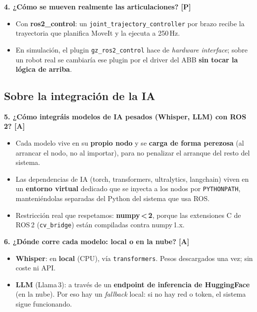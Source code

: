 \documentclass[11pt]{article}
\begin{document}
\textbf{4. ¿Cómo se mueven realmente las articulaciones? [P]}
\begin{itemize}
    \item Con \textbf{ros2\_control}: un \texttt{joint\_trajectory\_controller}
          por brazo recibe la trayectoria que planifica MoveIt y la ejecuta a
          250\,Hz.
    \item En simulación, el plugin \texttt{gz\_ros2\_control} hace de
          \textit{hardware interface}; sobre un robot real se cambiaría ese
          plugin por el driver del ABB \textbf{sin tocar la lógica de arriba}.
\end{itemize}

\subsection*{Sobre la integración de la IA}

\textbf{5. ¿Cómo integráis modelos de IA pesados (Whisper, LLM) con ROS\,2? [A]}
\begin{itemize}
    \item Cada modelo vive en su \textbf{propio nodo} y se \textbf{carga de forma
          perezosa} (al arrancar el nodo, no al importar), para no penalizar el
          arranque del resto del sistema.
    \item Las dependencias de IA (torch, transformers, ultralytics, langchain)
          viven en un \textbf{entorno virtual} dedicado que se inyecta a los
          nodos por \texttt{PYTHONPATH}, manteniéndolas separadas del Python del
          sistema que usa ROS.
    \item Restricción real que respetamos: \textbf{numpy\,<\,2}, porque las
          extensiones C de ROS\,2 (\texttt{cv\_bridge}) están compiladas contra
          numpy\,1.x.
\end{itemize}

\textbf{6. ¿Dónde corre cada modelo: local o en la nube? [A]}
\begin{itemize}
    \item \textbf{Whisper}: en \textbf{local} (CPU), vía \texttt{transformers}.
          Pesos descargados una vez; sin coste ni API.
    \item \textbf{LLM} (Llama\,3): a través de un \textbf{endpoint de inferencia
          de HuggingFace} (en la nube). Por eso hay un \textit{fallback} local:
          si no hay red o token, el sistema sigue funcionando.
\end{itemize}
\end{document}
